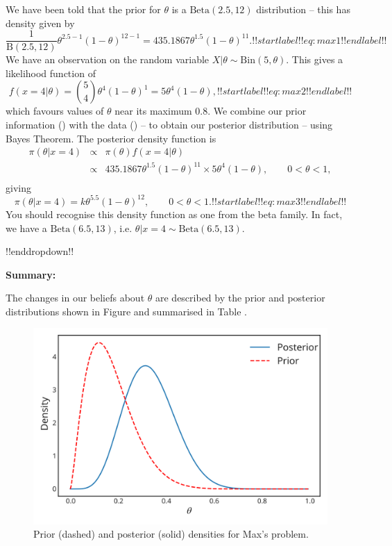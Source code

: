 {We have been told that the prior for $\theta$ is a $\mathrm{Beta}(2.5,12)$ distribution -- this has density given by
    \begin{equation}
    \frac{1}{\mathrm{B}(2.5,12)}\theta^{2.5-1}(1-\theta)^{12-1} = 435.1867\theta^{1.5}(1-\theta)^{11}.
    !!startlabel!! eq:max1 !!endlabel!!
    \end{equation}
    We have an observation on the random variable $X|\theta \sim \mathrm{Bin}(5,\theta)$.  This gives a likelihood function of 
    \begin{equation}
    f(x=4|\theta)  = \binom{5}{4} \theta^{4}(1-\theta)^{1} = 5 \theta^{4}(1-\theta),
    !!startlabel!! eq:max2 !!endlabel!!
    \end{equation}
    which favours values of $\theta$ near its maximum 0.8.  We combine our prior information () with the data () -- to obtain our posterior distribution -- using Bayes Theorem.  The posterior density function is
    \begin{eqnarray*}
    \pi(\theta|x=4) &\propto& \pi(\theta)f(x=4|\theta)\\
                    &\propto& 435.1867 \theta^{1.5}(1-\theta)^{11} \times 5 \theta^{4}(1-\theta), \qquad 0<\theta<1,  \\
    \end{eqnarray*}
    giving
    \begin{equation}
    \pi(\theta|x=4) = k \theta^{5.5}(1-\theta)^{12}, \qquad 0<\theta<1.
    !!startlabel!! eq:max3 !!endlabel!! 
    \end{equation}
    You should recognise this density function as one from the beta family.  In fact, we have a $\mathrm{Beta}(6.5, 13)$, i.e. $\theta|x=4 \sim \mathrm{Beta}(6.5,13)$.

!!enddropdown!!


\textbf{Summary:}

The changes in our beliefs about $\theta$ are described by the prior and posterior distributions shown in Figure  and summarised in Table .
\begin{figure}[h!]

\includegraphics{images/priorposterior2.svg}
\caption{Prior (dashed) and posterior (solid) densities for Max's problem.}
\label{fig:priorposterior2}


\end{figure}}
